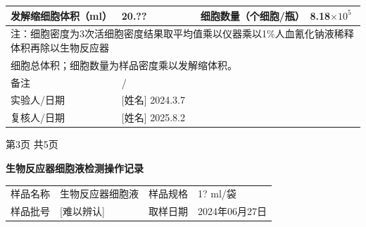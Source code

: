 \documentclass[UTF8,10pt,a4paper,fontset=fandol]{ctexart}
\newcommand{\fieldvalue}[1]{#1}
\newcommand{\handwritten}[1]{#1}
\begin{document}
\noindent
\begin{tabularx}{\textwidth}{|l|X|l|X|}
\hline
发解缩细胞体积（ml） &
\fieldvalue{\handwritten{20.??}} &
细胞数量（个细胞/瓶） &
\fieldvalue{\handwritten{8.18$\times10^5$}}
\\
\hline
\multicolumn{4}{|l|}{注：细胞密度为3次活细胞密度结果取平均值乘以仪器乘以1\%人血氰化钠液稀释体积再除以生物反应器}\\
\multicolumn{4}{|l|}{细胞总体积；细胞数量为样品密度乘以发解缩体积。}\\
\hline
备注 &
\fieldvalue{\handwritten{/}} &
\multicolumn{2}{l|}{}\\
\hline
实验人/日期 &
\fieldvalue{\handwritten{[姓名]}}
\quad
\fieldvalue{\handwritten{2024.3.7}} &
\multicolumn{2}{l|}{}\\
\hline
复核人/日期 &
\fieldvalue{\handwritten{[姓名]}}
\quad
\fieldvalue{\handwritten{2025.8.2}} &
\multicolumn{2}{l|}{}\\
\hline
\end{tabularx}

\begin{center}
第3页 共5页
\end{center}

\newpage

\begin{center}
\textbf{生物反应器细胞液检测操作记录}
\end{center}

\begin{tabularx}{\textwidth}{|>{\centering\arraybackslash}p{2.2cm}|X|>{\centering\arraybackslash}p{2.2cm}|X|}
\hline
\multicolumn{4}{|c|}{细胞生长状态检验}\\
\hline
样品名称 &
\fieldvalue{生物反应器细胞液} &
样品规格 &
\fieldvalue{\handwritten{1? ml/袋}}\\
\hline
样品批号 &
\fieldvalue{\handwritten{[难以辨认]}} &
取样日期 &
\fieldvalue{\handwritten{2024年06月27日}}\\
\hline
\end{tabularx}
\end{document}
